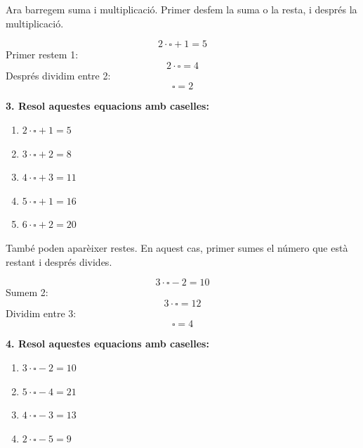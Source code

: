 \documentclass[12pt,a4paper]{article}
\begin{document}
\begin{capsula}
Ara barregem suma i multiplicació. Primer desfem la suma o la resta, i després la multiplicació.
\end{capsula}

\begin{exemple}
\[
2\cdot \square + 1 = 5
\]
Primer restem 1:
\[
2\cdot \square = 4
\]
Després dividim entre 2:
\[
\square = 2
\]
\end{exemple}

\textbf{3. Resol aquestes equacions amb caselles:}
\begin{enumerate}[label=\alph*)]
    \item $2\cdot \square + 1 = 5$ \vspace{0.8cm}
    \item $3\cdot \square + 2 = 8$ \vspace{0.8cm}
    \item $4\cdot \square + 3 = 11$ \vspace{0.8cm}
    \item $5\cdot \square + 1 = 16$ \vspace{0.8cm}
    \item $6\cdot \square + 2 = 20$ \vspace{0.8cm}
\end{enumerate}

\begin{capsula}
També poden aparèixer restes. En aquest cas, primer sumes el número que està restant i després divides.
\end{capsula}

\begin{exemple}
\[
3\cdot \square - 2 = 10
\]
Sumem 2:
\[
3\cdot \square = 12
\]
Dividim entre 3:
\[
\square = 4
\]
\end{exemple}

\textbf{4. Resol aquestes equacions amb caselles:}
\begin{enumerate}[label=\alph*)]
    \item $3\cdot \square - 2 = 10$ \vspace{0.8cm}
    \item $5\cdot \square - 4 = 21$ \vspace{0.8cm}
    \item $4\cdot \square - 3 = 13$ \vspace{0.8cm}
    \item $2\cdot \square - 5 = 9$ \vspace{0.8cm}
\end{enumerate}
\end{document}
